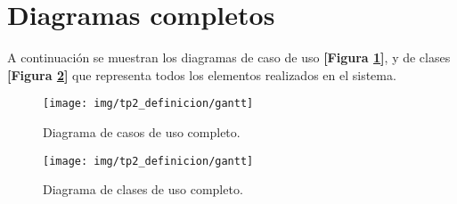 \section{Diagramas completos}
A continuación se muestran los diagramas de caso de uso \textbf{[Figura \ref{dcu-full}]}, y de clases \textbf{[Figura \ref{dc_full}]} que representa todos los elementos realizados en el sistema.


\begin{figure}[h]
	\centering
	\texttt{[image: img/tp2\_definicion/gantt]}
	\caption{Diagrama de casos de uso completo.}
	\label{dcu-full}
	\end{figure}
	


	\begin{figure}[h]
		\centering
		\texttt{[image: img/tp2\_definicion/gantt]}
		\caption{Diagrama de clases de uso completo.}
		\label{dc_full}
	\end{figure}